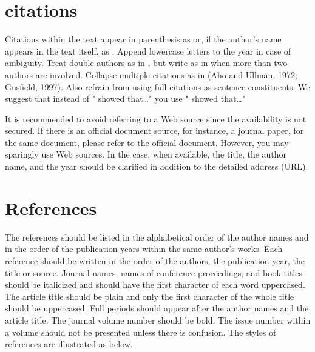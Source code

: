 \documentclass{ICLSarticle}
\begin{document}
\section*{citations}
Citations within the text appear in parenthesis as \parencite{linton_disability_1998} or, if the author’s name appears in the text itself, as \textcite{linton_disability_1998}. Append lowercase letters to the year in case of ambiguity. Treat double authors as in \parencite{sengupta-irving_conceptualizing_2017}, but write as in \parencite{decuyper_grasping_2010} when more than two authors are involved. Collapse multiple citations as in (Aho and Ullman, 1972; Gusfield, 1997). Also refrain from using full citations as sentence constituents. We suggest that instead of
"\parencite{linton_disability_1998} showed that\ldots"
you use
"\textcite{linton_disability_1998} showed that\ldots"


It is recommended to avoid referring to a Web source since the availability is not secured. If there is an official document source, for instance, a journal paper, for the same document, please refer to the official document. However, you may sparingly use Web sources. In the case, when available, the title, the author name, and the year should be clarified in addition to the detailed address (URL). 

\section*{References}
The references should be listed in the alphabetical order of the author names and in the order of the publication years within the same author’s works. Each reference should be written in the order of the authors, the publication year, the title or source. Journal names, names of conference proceedings, and book titles should be italicized and should have the first character of each word uppercased. The article title should be plain and only the first character of the whole title should be uppercased. Full periods should appear after the author names and the article title. The journal volume number should be bold. The issue number within a volume should not be presented unless there is confusion. The styles of references are illustrated as below.



\printbibliography[heading=bibintoc]
\end{document}
